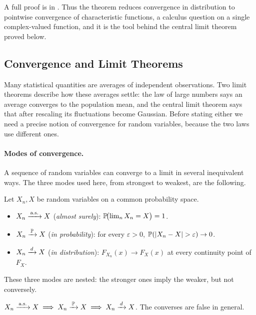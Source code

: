 A full proof is in \citet[][Thm.~26.3]{Billingsley1995}. Thus the theorem reduces convergence in distribution to pointwise convergence of characteristic functions, a calculus question on a single complex-valued function, and it is the tool behind the central limit theorem proved below.

\subsection{Convergence and Limit Theorems}\label{subsec:limit-theorems}

Many statistical quantities are averages of independent observations. Two limit theorems describe how these averages settle: the law of large numbers says an average converges to the population mean, and the central limit theorem says that after rescaling its fluctuations become Gaussian. Before stating either we need a precise notion of convergence for random variables, because the two laws use different ones.

\paragraph{Modes of convergence.}
A sequence of random variables can converge to a limit in several inequivalent ways. The three modes used here, from strongest to weakest, are the following.

\begin{definition}\label{def:modes}
Let \(X_n, X\) be random variables on a common probability space.
\begin{itemize}[leftmargin=1.5em,itemsep=0.25em]
  \item \(X_n \xrightarrow{\,\text{a.s.}\,} X\) (\emph{almost surely}): \(\mathbb{P}\!\bigl(\lim_n X_n = X\bigr) = 1\).
  \item \(X_n \xrightarrow{\,\mathbb{P}\,} X\) (\emph{in probability}): for every \(\varepsilon > 0\), \(\mathbb{P}(\lvert X_n - X\rvert > \varepsilon) \to 0\).
  \item \(X_n \xrightarrow{\,d\,} X\) (\emph{in distribution}): \(F_{X_n}(x) \to F_X(x)\) at every continuity point of \(F_X\).
\end{itemize}
\end{definition}

These three modes are nested: the stronger ones imply the weaker, but not conversely.

\begin{proposition}\label{prop:convergence-implications}
\(X_n \xrightarrow{\,\text{a.s.}\,} X \;\Longrightarrow\; X_n \xrightarrow{\,\mathbb{P}\,} X \;\Longrightarrow\; X_n \xrightarrow{\,d\,} X\). The converses are false in general.
\end{proposition}


